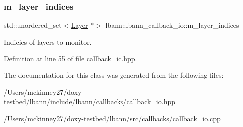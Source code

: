 \subsubsection{\texorpdfstring{m\+\_\+layer\+\_\+indices}{m\_layer\_indices}}
{\footnotesize\ttfamily std\+::unordered\+\_\+set$<$\hyperlink{classlbann_1_1Layer}{Layer} $\ast$$>$ lbann\+::lbann\+\_\+callback\+\_\+io\+::m\+\_\+layer\+\_\+indices\hspace{0.3cm}{\ttfamily [private]}}

Indicies of layers to monitor. 

Definition at line 55 of file callback\+\_\+io.\+hpp.



The documentation for this class was generated from the following files\+:\begin{DoxyCompactItemize}
\item 
/\+Users/mckinney27/doxy-\/testbed/lbann/include/lbann/callbacks/\hyperlink{callback__io_8hpp}{callback\+\_\+io.\+hpp}\item 
/\+Users/mckinney27/doxy-\/testbed/lbann/src/callbacks/\hyperlink{callback__io_8cpp}{callback\+\_\+io.\+cpp}\end{DoxyCompactItemize}
